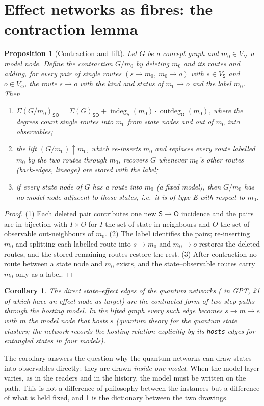 \documentclass[11pt,a4paper,twoside,openany]{report}
\theoremstyle{plain}
\newtheorem{proposition}[theorem]{Proposition}
\newtheorem{corollary}[theorem]{Corollary}
\theoremstyle{definition}
\theoremstyle{remark}
\newcommand{\lay}[1]{\mathsf{#1}}
\newcommand{\VS}{V_{\lay S}}\newcommand{\VM}{V_{\lay M}}\newcommand{\VO}{V_{\lay O}}
\newcommand{\id}[1]{\texttt{#1}}
\DeclareMathOperator{\indeg}{indeg}\DeclareMathOperator{\outdeg}{outdeg}\DeclareMathOperator{\supp}{supp}
\begin{document}
\section{Effect networks as fibres: the contraction lemma}\label{sec:contraction}
\begin{proposition}[Contraction and lift]\label{prop:contraction}
Let $G$ be a concept graph and $m_0\in\VM$ a model node. Define the \emph{contraction} $G/m_0$ by deleting $m_0$ and its routes and adding, for every pair of single routes $(s\to m_0,\ m_0\to o)$ with $s\in\VS$ and $o\in\VO$, the route $s\to o$ with the kind and status of $m_0\to o$ and the label $m_0$. Then
\begin{enumerate}[nosep]
\item $\Sigma(G/m_0)_{\lay S\lay O}=\Sigma(G)_{\lay S\lay O}+\indeg_{\lay S}(m_0)\cdot\outdeg_{\lay O}(m_0)$, where the degrees count single routes into $m_0$ from state nodes and out of $m_0$ into observables;
\item the \emph{lift} $(G/m_0)\!\uparrow\! m_0$, which re-inserts $m_0$ and replaces every route labelled $m_0$ by the two routes through $m_0$, recovers $G$ whenever $m_0$'s other routes (back-edges, lineage) are stored with the label;
\item if every state node of $G$ has a route into $m_0$ (a fixed model), then $G/m_0$ has no model node adjacent to those states, i.e.\ it is of type E with respect to $m_0$.
\end{enumerate}
\end{proposition}
\begin{proof}
(1) Each deleted pair contributes one new $\lay S\to\lay O$ incidence and the pairs are in bijection with $I\times O$ for $I$ the set of state in-neighbours and $O$ the set of observable out-neighbours of $m_0$. (2) The label identifies the pairs; re-inserting $m_0$ and splitting each labelled route into $s\to m_0$ and $m_0\to o$ restores the deleted routes, and the stored remaining routes restore the rest. (3) After contraction no route between a state node and $m_0$ exists, and the state--observable routes carry $m_0$ only as a label.
\end{proof}
\begin{corollary}
The direct state--effect edges of the quantum networks (\NGPTPairStoO{} in GPT, 21 of which have an effect node as target) are the contracted form of two-step paths through the hosting model. In the lifted graph every such edge becomes $s\to m\to e$ with $m$ the model node that hosts $s$ (quantum theory for the quantum state clusters; the network records the hosting relation explicitly by its \id{hosts} edges for entangled states in four models).
\end{corollary}
The corollary answers the question why the quantum networks can draw states into observables directly: they are drawn \emph{inside one model}. When the model layer varies, as in the readers and in the history, the model must be written on the path. This is not a difference of philosophy between the instances but a difference of what is held fixed, and \cref{prop:contraction} is the dictionary between the two drawings.
\end{document}
